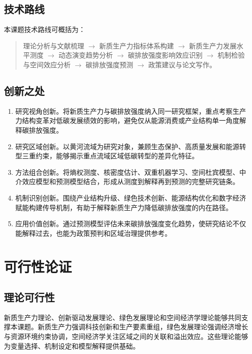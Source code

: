 \documentclass[UTF8,a4paper,zihao=-4,fontset=windows]{ctexart}
\newcommand{\regionscope}{黄河流域}
\begin{document}
\subsection{技术路线}

本课题技术路线可概括为：

\begin{quote}
理论分析与文献梳理
$\rightarrow$
新质生产力指标体系构建
$\rightarrow$
新质生产力发展水平测度
$\rightarrow$
动态演变趋势分析
$\rightarrow$
碳排放强度影响效应识别
$\rightarrow$
机制检验与空间效应分析
$\rightarrow$
碳排放强度预测
$\rightarrow$
政策建议与论文写作。
\end{quote}

\subsection{创新之处}

\begin{enumerate}[label=\arabic*.]
  \item 研究视角创新。将新质生产力与碳排放强度纳入同一研究框架，重点考察生产力结构变革对低碳发展绩效的影响，避免仅从能源消费或产业结构单一角度解释碳排放强度。
  \item 研究区域创新。以\regionscope 为研究对象，兼顾生态保护、高质量发展和能源转型三重约束，能够揭示重点流域区域低碳转型的差异化特征。
  \item 方法组合创新。将熵权测度、核密度估计、双重机器学习、空间杜宾模型、中介效应模型和预测模型结合，形成从测度到解释再到预测的完整研究链条。
  \item 机制识别创新。围绕产业结构升级、绿色技术创新、能源结构优化和数字经济赋能构建传导机制，有助于解释新质生产力降低碳排放强度的内在路径。
  \item 应用价值创新。通过预测模型评估未来碳排放强度变化趋势，使研究结论不仅能解释过去，也能为政策预判和区域治理提供参考。
\end{enumerate}

\section{可行性论证}

\subsection{理论可行性}

新质生产力理论、创新驱动发展理论、绿色发展理论和空间经济学理论能够共同支撑本课题。新质生产力强调科技创新和生产要素重组，绿色发展理论强调经济增长与资源环境约束协调，空间经济学关注区域之间的关联和溢出效应。这些理论能够为变量选择、机制设定和模型解释提供基础。
\end{document}

